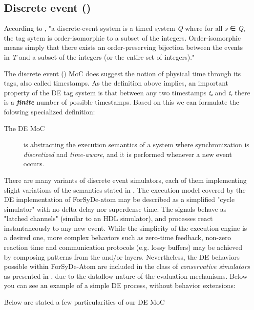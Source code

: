 \subsection{Discrete event ()}
According to \cite{Lee98}, "a
 discrete-event system is a timed system \emph{Q} where for all \emph{s}
 ∈ \emph{Q}, the tag sytem is order-isomorphic to a subset of the
 integers. Order-isomorphic means simply that there exists an
 order-preserving bijection between the events in \emph{T} and a subset
 of the integers (or the entire set of integers)."\par
The discrete event () MoC does suggest the notion of physical
 time through its tags, also called timestamps. As the definition
 above implies, an important property of the DE tag system is that
 between any two timestamps \emph{tᵤ} and \emph{tᵥ} there is a
 \textbf{\emph{finite}} number of possible timestamps. Based on this we can
 formulate the folowing specialized definition:\par
\begin{description}
\item[The DE MoC] is abstracting the execution semantics of a system
 where synchronization is \emph{discretized} and \emph{time-aware}, and it
 is performed whenever a new event occurs.
\end{description}There are many variants of discrete event simulators, each of
 them implementing slight variations of the semantics stated in
 \cite{Lee98}. The execution model covered by
 the DE implementation of ForSyDe-atom may be described as a
 simplified "cycle simulator" with no delta-delay nor superdense
 time. The signals behave as "latched channels" (similar to an HDL
 simulator), and processes react instantaneously to any new
 event. While the simplicity of the execution engine is a desired
 one, more complex behaviors such as zero-time feedback, non-zero
 reaction time and communication protocols (e.g. lossy buffers)
 may be achieved by composing patterns from the 
 and/or  layers. Nevertheless, the DE behaviors
 possible within ForSyDe-Atom are included in the class of
 \emph{conservative simulators} as presented in
 \cite{Fujimoto00}, due to the dataflow
 nature of the evaluation mechanisms. Below you can see an example
 of a simple DE process, without behavior extensions:\par
                 \par
                 Below are stated a few particularities of our DE MoC

